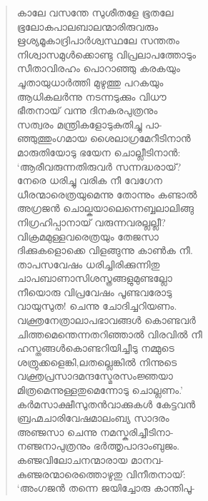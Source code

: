 \begin{verse}
കാലേ വസന്തേ സുശീതളേ ഭൂതലേ\\
ഭൂലോകപാലബാലന്മാരിരുവരും\\
ഋശ്യമൂകാദ്രിപാര്‍ശ്വസ്ഥലേ സന്തതം\\
നിശ്വാസമുള്‍ക്കൊണ്ടു വിപ്രലാപത്തോടും\\
സീതാവിരഹം പൊറാഞ്ഞു കരകയും\\
ചൂതായുധാര്‍ത്തി മുഴുത്തു പറകയും\\
ആധികലര്‍ന്നു നടന്നടുക്കും വിധൗ\\
ഭീതനായ് വന്നു ദിനകരപുത്രനും\\
സത്വരം മന്ത്രികളോടുകുതിച്ചു പാ-\\
ഞ്ഞുത്തുംഗമായ ശൈലാഗ്രമേറീടിനാന്‍\\
മാരുതിയോടു ഭയേന ചൊല്ലീടിനാന്‍:\\
‘ആരീവരുന്നതിരുവര്‍ സന്നദ്ധരായ്?\\
നേരെ ധരിച്ചു വരിക നീ വേഗേന\\
ധീരന്മാരെത്രയുമെന്നു തോന്നും കണ്ടാല്‍\\
അഗ്രജന്‍ ചൊല്കയാലെന്നെബ്ബലാലിങ്ങു\\
നിഗ്രഹിപ്പാനായ് വരുന്നവരല്ലല്ലീ?\\
വിക്രമമുള്ളവരെത്രയും തേജസാ\\
ദിക്കുകളൊക്കെ വിളങ്ങുന്നു കാണ്‍ക നീ.\\
താപസവേഷം ധരിച്ചിരിക്കുന്നിതു\\
ചാപബാണാസിശസ്ത്രങ്ങളുമുണ്ടല്ലോ\\
നീയൊരു വിപ്രവേഷം പൂണ്ടവരോടു\\
വായുസുത! ചെന്നു ചോദിച്ചറിയണം.\\
വക്ത്രനേത്രാലാപഭാവങ്ങള്‍ കൊണ്ടവര്‍\\
ചിത്തമെന്തെന്നതറിഞ്ഞാല്‍ വിരവില്‍ നീ\\
ഹസ്തങ്ങള്‍കൊണ്ടറിയിച്ചീടു നമ്മുടെ\\
ശത്രുക്കളെങ്കി,ലതല്ലെങ്കില്‍ നിന്നുടെ\\
വക്ത്രപ്രസാദമന്ദസ്മേരസംജ്ഞയാ\\
മിത്രമെന്നുള്ളതുമെന്നോടു ചൊല്ലണം.’\\
കര്‍മസാക്ഷീസുതന്‍വാക്കുകള്‍ കേട്ടവന്‍\\
ബ്രഹ്മചാരിവേഷമാലംബ്യ സാദരം\\
അഞ്ജസാ ചെന്നു നമസ്കരിച്ചീടിനാ-\\
നഞ്ജനാപുത്രനും ഭര്‍ത്തൃപാദാംബുജം.\\
കഞ്ജവിലോചനന്മാരായ മാനവ-\\
കുഞ്ജരന്മാരെത്തൊഴുതു വിനീതനായ്:\\
‘അംഗജന്‍ തന്നെ ജയിച്ചോരു കാന്തിപൂ-\\

\end{verse}
